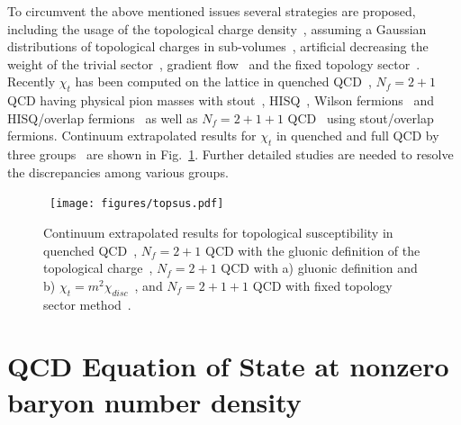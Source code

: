 \documentclass{PoS}
\begin{document}
To circumvent the above mentioned issues several strategies are proposed, including the usage of the topological charge density~\cite{ Bautista:2015yza}, assuming a Gaussian distributions of 
topological charges in sub-volumes~\cite{Bietenholz:2015rsa}, artificial decreasing the weight of the trivial sector~\cite{Kitano:2015fla}, gradient flow~\cite{Taniguchi:2016tjc} and the fixed topology sector~\cite{Frison:2016vuc,Borsanyi:2016ksw}. Recently $\chi_t$ has been computed  on the lattice in quenched QCD~\cite{Berkowitz:2015aua,Kitano:2015fla,Borsanyi:2015cka},
$N_f=2+1$ QCD having physical pion masses with stout~\cite{Bonati:2015vqz}, HISQ~\cite{Petreczky:2016vrs},  Wilson fermions~\cite{Taniguchi:2016tjc} and HISQ/overlap fermions~\cite{Sharma:2016cmz}
as well as $N_f=2+1+1$ QCD~\cite{Borsanyi:2016ksw} using stout/overlap fermions. Continuum extrapolated results for $\chi_t$ in quenched and full QCD by three groups~\cite{Borsanyi:2015cka,Bonati:2015vqz,Petreczky:2016vrs,Borsanyi:2016ksw} are shown in Fig.~\ref{fig:topsus}. Further detailed studies are needed to resolve the discrepancies among various groups.
\begin{figure}
\begin{center}
~\texttt{[image: figures/topsus.pdf]}
\end{center}
\caption{Continuum extrapolated results for topological susceptibility in quenched QCD~\cite{Borsanyi:2015cka}, $N_f=2+1$ QCD with the gluonic definition of the topological charge~\cite{Bonati:2015vqz}, $N_f=2+1$ QCD with a) gluonic definition and b) $\chi_t=m^2\chi_{disc}$~\cite{Petreczky:2016vrs}, and $N_f=2+1+1$ QCD with fixed topology sector method~\cite{Borsanyi:2016ksw}.}
\label{fig:topsus}
\end{figure}


 

 








\section{QCD Equation of State at nonzero baryon number density}
\label{sec:EoSMu}
\end{document}
